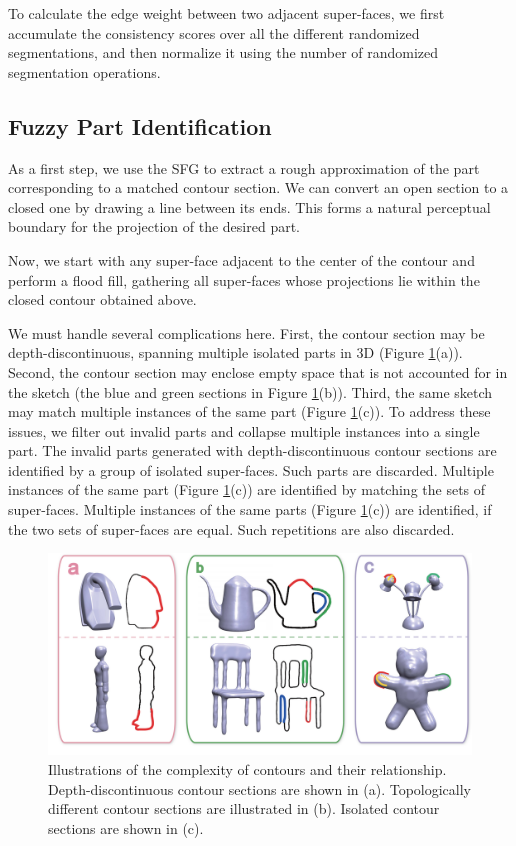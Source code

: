 To calculate the edge weight between two adjacent super-faces, we first accumulate the consistency scores over all the different randomized segmentations, and then normalize it using the number of randomized segmentation operations.

\subsection{Fuzzy Part Identification}
As a first step, we use the SFG to extract a rough approximation of the part corresponding to a matched contour section. We can convert an open section to a closed one by drawing a line between its ends. This forms a natural perceptual boundary for the projection of the desired part.

Now, we start with any super-face adjacent to the center of the contour and perform a flood fill, gathering all super-faces whose projections lie within the closed contour obtained above.

We must handle several complications here. First, the contour section may be depth-discontinuous, spanning multiple isolated parts in 3D (Figure \ref{fig:ComplexCtour}(a)). Second, the contour section may enclose empty space that is not accounted for in the sketch (the blue and green sections in Figure \ref{fig:ComplexCtour}(b)). Third, the same sketch may match multiple instances of the same part (Figure \ref{fig:ComplexCtour}(c)). To address these issues, we filter out invalid parts and collapse multiple instances into a single part. The invalid parts generated with depth-discontinuous contour sections are identified by a group of isolated super-faces. Such parts are discarded. Multiple instances of the same part (Figure \ref{fig:ComplexCtour}(c)) are identified by matching the sets of super-faces. Multiple instances of the same parts (Figure \ref{fig:ComplexCtour}(c)) are identified, if the two sets of super-faces are equal. Such repetitions are also discarded.

\begin{figure}\centering
\includegraphics[width=\linewidth]{./Material/ComplexCtour.pdf}
\caption{Illustrations of the complexity of contours and their relationship. Depth-discontinuous contour sections are shown in (a). Topologically different contour sections are illustrated in (b). Isolated contour sections are shown in (c).}\label{fig:ComplexCtour}
\end{figure}

